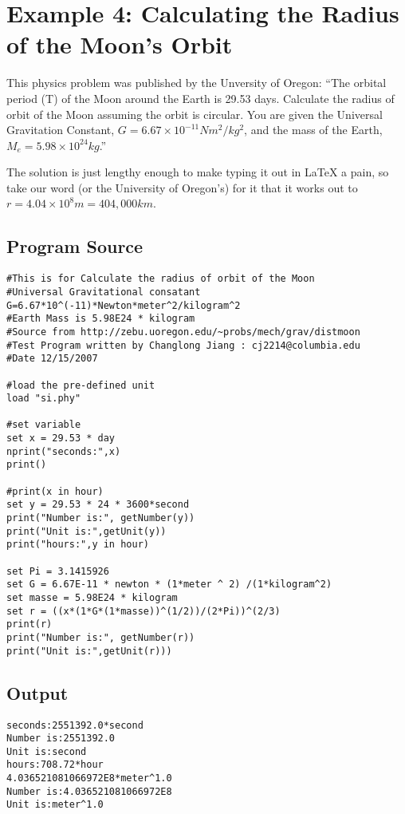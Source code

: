 \section{Example 4: Calculating the Radius of the Moon's Orbit}

This physics problem was published by the Unversity of
Oregon\cite{moonorbit}: ``The orbital period (T) of the Moon around
the Earth is 29.53 days. Calculate the radius of orbit of the Moon
assuming the orbit is circular. You are given the Universal
Gravitation Constant, \(G = 6.67 \times 10^{-11} Nm^{2}/kg^{2}\), and
the mass of the Earth, \(M_{e} = 5.98 \times 10^{24} kg\).''

The solution is just lengthy enough to make typing it out in \LaTeX{}
a pain, so take our word (or the University of Oregon's) for it that
it works out to \(r = 4.04 \times 10^{8} m = 404,000 km\).


\subsection{Program Source}

\begin{verbatim}
#This is for Calculate the radius of orbit of the Moon
#Universal Gravitational consatant G=6.67*10^(-11)*Newton*meter^2/kilogram^2
#Earth Mass is 5.98E24 * kilogram
#Source from http://zebu.uoregon.edu/~probs/mech/grav/distmoon
#Test Program written by Changlong Jiang : cj2214@columbia.edu
#Date 12/15/2007 

#load the pre-defined unit
load "si.phy" 

#set variable
set x = 29.53 * day 
nprint("seconds:",x)
print()

#print(x in hour)
set y = 29.53 * 24 * 3600*second
print("Number is:", getNumber(y))
print("Unit is:",getUnit(y))
print("hours:",y in hour) 

set Pi = 3.1415926
set G = 6.67E-11 * newton * (1*meter ^ 2) /(1*kilogram^2) 
set masse = 5.98E24 * kilogram
set r = ((x*(1*G*(1*masse))^(1/2))/(2*Pi))^(2/3)
print(r)
print("Number is:", getNumber(r))
print("Unit is:",getUnit(r))) 
\end{verbatim} 

\subsection{Output}

\begin{verbatim}
seconds:2551392.0*second
Number is:2551392.0
Unit is:second
hours:708.72*hour
4.036521081066972E8*meter^1.0
Number is:4.036521081066972E8
Unit is:meter^1.0
\end{verbatim}

